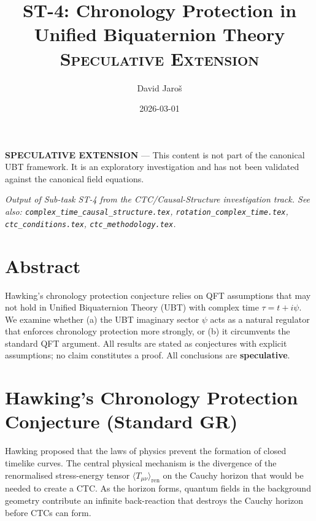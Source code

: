 \documentclass[12pt]{article}
\title{ST-4: Chronology Protection in\\
Unified Biquaternion Theory\\[0.5em]
\large\textsc{Speculative Extension}}
\author{David Jaroš}
\date{2026-03-01}
\begin{document}
\maketitle

\begin{tcolorbox}[colback=yellow!10, title=Status]
\textbf{SPECULATIVE EXTENSION} — This content is not part of
the canonical UBT framework. It is an exploratory investigation
and has not been validated against the canonical field equations.
\end{tcolorbox}

\vspace{1em}
\noindent\textit{Output of Sub-task ST-4 from the CTC/Causal-Structure investigation track.
See also: \texttt{complex\_time\_causal\_structure.tex},
\texttt{rotation\_complex\_time.tex},
\texttt{ctc\_conditions.tex}, \texttt{ctc\_methodology.tex}.}

\section*{Abstract}
Hawking's chronology protection conjecture \cite{Hawking1992} relies on
QFT assumptions that may not hold in Unified Biquaternion Theory (UBT)
with complex time $\tau = t + i\psi$.  We examine whether (a) the UBT
imaginary sector $\psi$ acts as a natural regulator that enforces
chronology protection more strongly, or (b) it circumvents the
standard QFT argument.  All results are stated as conjectures with
explicit assumptions; no claim constitutes a proof.
All conclusions are \textbf{speculative}.

\section{Hawking's Chronology Protection Conjecture (Standard GR)}
Hawking \cite{Hawking1992} proposed that the laws of physics prevent
the formation of closed timelike curves.  The central physical mechanism
is the divergence of the renormalised stress-energy tensor
$\langle T_{\mu\nu}\rangle_{\mathrm{ren}}$ on the Cauchy horizon that
would be needed to create a CTC.  As the horizon forms, quantum fields
in the background geometry contribute an infinite back-reaction that
destroys the Cauchy horizon before CTCs can form.
\end{document}
